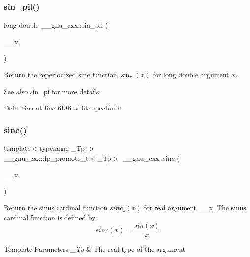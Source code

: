 \subsubsection{\texorpdfstring{sin\+\_\+pil()}{sin\_pil()}}
{\footnotesize\ttfamily long double \+\_\+\+\_\+gnu\+\_\+cxx\+::sin\+\_\+pil (\begin{DoxyParamCaption}\item[{long double}]{\+\_\+\+\_\+x }\end{DoxyParamCaption})\hspace{0.3cm}{\ttfamily [inline]}}

Return the reperiodized sine function $ \sin_\pi(x) $ for {\ttfamily long double} argument $ x $.

\begin{DoxySeeAlso}{See also}
\hyperlink{group__gnu__math__spec__func_ga220f8a9a0477697cff96e84dc911d5f0}{sin\+\_\+pi} for more details. 
\end{DoxySeeAlso}


Definition at line 6136 of file specfun.\+h.

\mbox{\label{group__gnu__math__spec__func_ga09976b5d041113979c93613cc3700348}} 
\subsubsection{\texorpdfstring{sinc()}{sinc()}}
{\footnotesize\ttfamily template$<$typename \+\_\+\+Tp $>$ \\
\+\_\+\+\_\+gnu\+\_\+cxx\+::fp\+\_\+promote\+\_\+t$<$\+\_\+\+Tp$>$ \+\_\+\+\_\+gnu\+\_\+cxx\+::sinc (\begin{DoxyParamCaption}\item[{\+\_\+\+Tp}]{\+\_\+\+\_\+x }\end{DoxyParamCaption})\hspace{0.3cm}{\ttfamily [inline]}}

Return the sinus cardinal function $ sinc_\pi(x) $ for real argument {\ttfamily \+\_\+\+\_\+x}. The sinus cardinal function is defined by\+: \[ sinc(x) = \frac{sin(x)}{x} \]


\begin{DoxyTemplParams}{Template Parameters}
{\em \+\_\+\+Tp} & The real type of the argument \\
\hline
\end{DoxyTemplParams}

